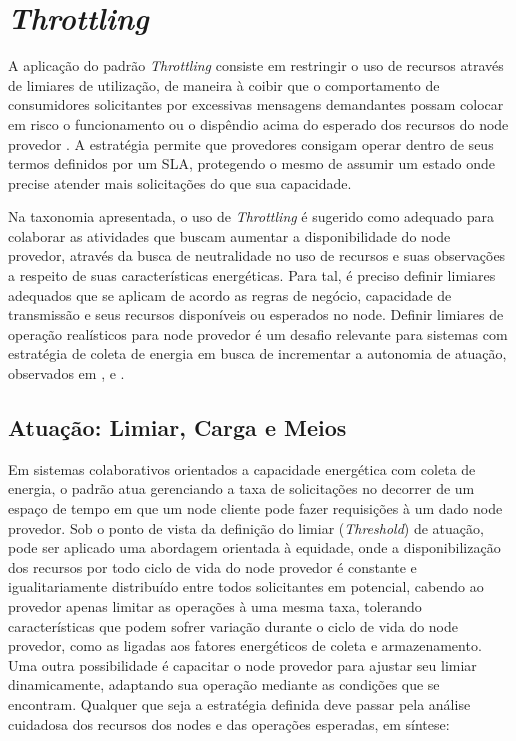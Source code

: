 \section{\textit{Throttling}}


A aplicação do padrão \textit{Throttling} consiste em restringir o uso de recursos através de limiares de utilização, de maneira à coibir que o comportamento de consumidores solicitantes por excessivas mensagens demandantes possam colocar em risco o funcionamento ou o dispêndio acima do esperado dos recursos do node provedor \cite{martinekuan_throttling_nodate}. A estratégia permite que provedores consigam operar dentro de seus termos definidos por um \acf{SLA}, protegendo o mesmo de assumir um estado onde precise atender mais solicitações do que sua capacidade.

 Na taxonomia apresentada, o uso de \textit{Throttling} é sugerido como adequado para colaborar as atividades que buscam aumentar a disponibilidade do node provedor, através da busca de neutralidade no uso de recursos e suas observações a respeito de suas características energéticas. Para tal, é preciso definir limiares adequados que se aplicam de acordo as regras de negócio, capacidade de transmissão e seus recursos disponíveis ou esperados no node. Definir limiares de operação realísticos para node provedor é um desafio relevante para sistemas com estratégia de coleta de energia em busca de incrementar a autonomia de atuação, observados em \cite{khairnar_discrete-rate_2015}, \cite{liu_energy_2016} e \cite{zhang_toward_2018}.

\subsection{Atuação: Limiar, Carga e Meios}
Em sistemas colaborativos orientados a capacidade energética com coleta de energia, o padrão atua gerenciando a taxa de solicitações no decorrer de um espaço de tempo em que um node cliente pode fazer requisições à um dado node provedor. Sob o ponto de vista da definição do limiar (\textit{Threshold}) de atuação, pode ser aplicado uma abordagem orientada à equidade, onde a disponibilização dos recursos por todo ciclo de vida do node provedor é constante e igualitariamente distribuído entre todos solicitantes em potencial, cabendo ao provedor apenas limitar as operações à uma mesma taxa, tolerando características que podem sofrer variação durante o ciclo de vida do node provedor, como as ligadas aos fatores energéticos de coleta e armazenamento.  Uma outra possibilidade é capacitar o node provedor para ajustar seu limiar dinamicamente, adaptando sua operação mediante as condições que se encontram. Qualquer que seja a estratégia definida deve passar pela análise cuidadosa dos recursos dos nodes  e das operações esperadas, em síntese: 

